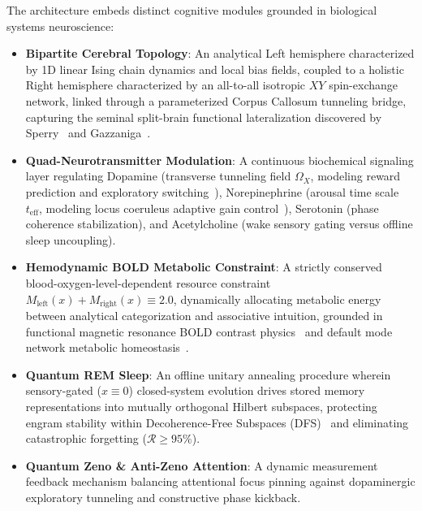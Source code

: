 \documentclass[10pt,twocolumn,3p]{article}
\begin{document}
The architecture embeds distinct cognitive modules grounded in biological systems neuroscience:
\begin{itemize}
    \item \textbf{Bipartite Cerebral Topology}: An analytical Left hemisphere characterized by 1D linear Ising chain dynamics and local bias fields, coupled to a holistic Right hemisphere characterized by an all-to-all isotropic $XY$ spin-exchange network, linked through a parameterized Corpus Callosum tunneling bridge, capturing the seminal split-brain functional lateralization discovered by Sperry~\cite{sperry1968} and Gazzaniga~\cite{gazzaniga2005}.
    \item \textbf{Quad-Neurotransmitter Modulation}: A continuous biochemical signaling layer regulating Dopamine (transverse tunneling field $\Omega_X$, modeling reward prediction and exploratory switching~\cite{schultz1998}), Norepinephrine (arousal time scale $t_{\text{eff}}$, modeling locus coeruleus adaptive gain control~\cite{astonjones2005}), Serotonin (phase coherence stabilization), and Acetylcholine (wake sensory gating versus offline sleep uncoupling).
    \item \textbf{Hemodynamic BOLD Metabolic Constraint}: A strictly conserved blood-oxygen-level-dependent resource constraint $M_{\text{left}}(x) + M_{\text{right}}(x) \equiv 2.0$, dynamically allocating metabolic energy between analytical categorization and associative intuition, grounded in functional magnetic resonance BOLD contrast physics~\cite{ogawa1990} and default mode network metabolic homeostasis~\cite{raichle2001}.
    \item \textbf{Quantum REM Sleep}: An offline unitary annealing procedure wherein sensory-gated ($x \equiv 0$) closed-system evolution drives stored memory representations into mutually orthogonal Hilbert subspaces, protecting engram stability within Decoherence-Free Subspaces (DFS)~\cite{lidar1998} and eliminating catastrophic forgetting ($\mathcal{R} \ge 95\%$).
    \item \textbf{Quantum Zeno \& Anti-Zeno Attention}: A dynamic measurement feedback mechanism balancing attentional focus pinning against dopaminergic exploratory tunneling and constructive phase kickback.
\end{itemize}
\end{document}
